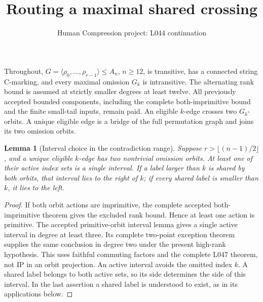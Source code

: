 \documentclass[11pt,a4paper]{article}
\title{Routing a maximal shared crossing}
\author{Human Compression project: L044 continuation}
\date{}
\newtheorem{lemma}{Lemma}
\newcommand{\gen}[1]{\langle#1\rangle}
\begin{document}
\maketitle
Throughout, $G=\gen{\rho_0,\ldots,\rho_{r-1}}\leq A_n$, $n\geq12$,
is transitive, has a connected string C-marking, and every maximal
omission $G_k$ is intransitive. The alternating rank bound is assumed
at strictly smaller degrees at least twelve. All previously accepted
bounded components, including the complete both-imprimitive bound
and the finite small-tail inputs, remain paid.
An eligible $k$-edge crosses two $G_k$-orbits. A unique eligible
edge is a bridge of the full permutation graph and joins its two
omission orbits.

\begin{lemma}[Interval choice in the contradiction range]\label{choice}
Suppose $r>\lfloor(n-1)/2\rfloor$, and a unique eligible $k$-edge
has two nontrivial omission orbits. At least one of their active
index sets is a single interval. If a label larger than $k$ is
shared by both orbits, that interval lies to the right of $k$;
if every shared label is smaller than $k$, it lies to the left.
\end{lemma}
\begin{proof}
If both orbit actions are imprimitive, the complete accepted
both-imprimitive theorem gives the excluded rank bound. Hence at
least one action is primitive. The accepted primitive-orbit interval
lemma gives a single active interval in degree at least three.
Its complete two-point exception theorem supplies the same conclusion
in degree two under the present high-rank hypothesis. This uses
faithful commuting factors and the complete L047 theorem, not IP in
an orbit projection. An active interval avoids the omitted index $k$.
A shared label belongs to both active sets, so its side determines
the side of this interval. In the last assertion a shared label is
understood to exist, as in its applications below.
\end{proof}
\end{document}
